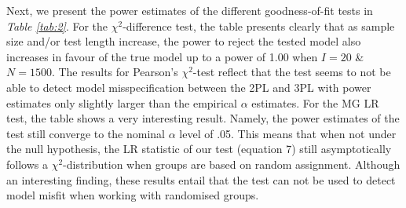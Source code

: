 \documentclass[Royal,sageapa,times,doublespace]{sagej}
\begin{document}
\indent Next, we present the power estimates of the different goodness-of-fit tests in \textit{Table \ref{tab:2}}. For the $\chi^2$-difference test, the table presents clearly that as sample size and/or test length increase, the power to reject the tested model also increases in favour of the true model up to a power of 1.00 when $I = 20$ \& $N = 1500$. The results for Pearson's $\chi^2$-test reflect that the test seems to not be able to detect model misspecification between the 2PL and 3PL with power estimates only slightly larger than the empirical $\alpha$ estimates. For the MG LR test, the table shows a very interesting result. Namely, the power estimates of the test still converge to the nominal $\alpha$ level of .05. This means that when not under the null hypothesis, the LR statistic of our test (equation 7) still asymptotically follows a $\chi^2$-distribution when groups are based on random assignment. Although an interesting finding, these results entail that the test can not be used to detect model misfit when working with randomised groups.
\end{document}
